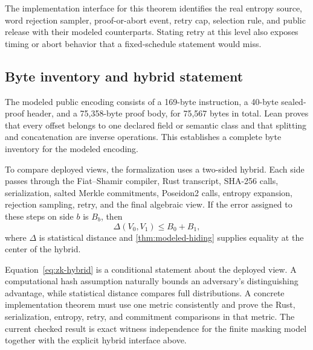 The implementation interface for this theorem identifies the real entropy source,
word rejection sampler, proof-or-abort event, retry cap, selection rule, and
public release with their modeled counterparts.  Stating retry at this level
also exposes timing or abort behavior that a fixed-schedule statement would
miss.

\subsection{Byte inventory and hybrid statement}

The modeled public encoding consists of a 169-byte instruction, a 40-byte
sealed-proof header, and a 75,358-byte proof body, for 75,567 bytes in total.
Lean proves that every offset belongs to one declared field or semantic class
and that splitting and concatenation are inverse operations.  This establishes
a complete byte inventory for the modeled encoding.

To compare deployed views, the formalization uses a two-sided hybrid.  Each
side passes through the Fiat--Shamir compiler, Rust transcript, SHA-256 calls,
serialization, salted Merkle commitments, Poseidon2 calls, entropy expansion,
rejection sampling, retry, and the final algebraic view.  If the error assigned
to these steps on side \(b\) is \(B_b\), then
\begin{equation}
  \Delta(V_0,V_1)\leq B_0+B_1,
  \label{eq:zk-hybrid}
\end{equation}
where \(\Delta\) is statistical distance and
\cref{thm:modeled-hiding} supplies equality at the center of the hybrid.

Equation~\eqref{eq:zk-hybrid} is a conditional statement about the deployed view.  A
computational hash assumption naturally bounds an adversary's distinguishing
advantage, while statistical distance compares full distributions.  A
concrete implementation theorem must use one metric consistently and prove the
Rust, serialization, entropy, retry, and commitment comparisons in that
metric.  The current checked result is exact witness independence for the
finite masking model together with the explicit hybrid interface above.
